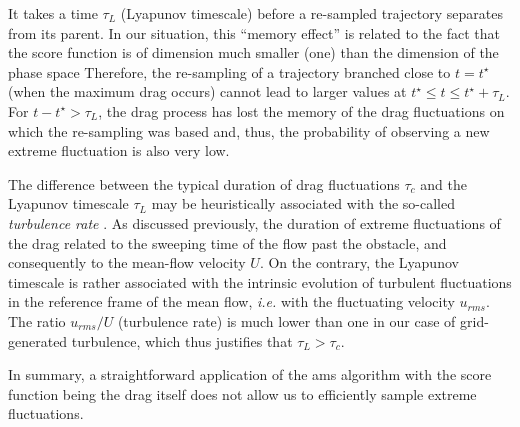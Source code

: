 It takes a time $\tau_L$ (Lyapunov timescale) before a re-sampled trajectory separates from its parent. In our situation, this ``memory effect'' is related to the fact that the score function is of dimension much smaller (one) than the dimension of the phase space  
%
%
%
Therefore, the re-sampling of a trajectory branched close to $t=t^{\star}$ (when the maximum drag occurs) cannot lead to larger values at $t^{\star} \leq t \leq t^{\star}+\tau_L$.
For $t - t^{\star} >\tau_L$, the drag process has lost the memory of the drag fluctuations on which the re-sampling was based and, thus, the probability of observing a new extreme fluctuation is also very low. 
%
%

The difference between the typical duration of drag fluctuations $\tau_c$ and the Lyapunov timescale $\tau_L$ may be heuristically associated with the so-called \emph{turbulence rate} .
%
As discussed previously, the duration of extreme fluctuations of the drag  related to the sweeping time of the flow past the obstacle, and consequently to the mean-flow velocity $U$. On the contrary, the Lyapunov timescale is rather associated with the intrinsic evolution of turbulent fluctuations in the reference frame of the mean flow, \textit{i.e.} with the fluctuating velocity $u_{rms}$. The ratio $u_{rms}/U$ (turbulence rate) is much lower than one in our case of grid-generated turbulence, which thus justifies that $\tau_L > \tau_c$.

%
In summary, a straightforward application of the \ac{ams} algorithm with the score function being the drag itself does not allow us to efficiently sample extreme fluctuations.
%

